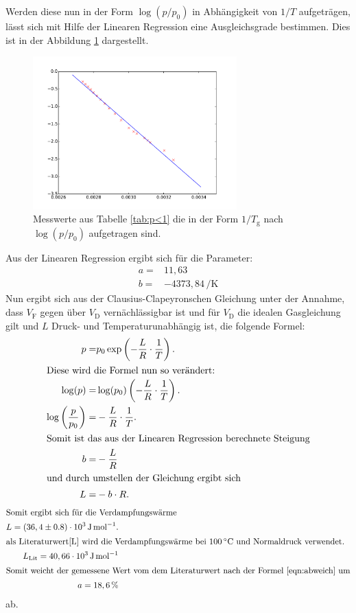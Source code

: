 \FloatBarrier
Werden diese nun in der Form $\log(p/p_\mathrm{0})$ in Abhängigkeit von
$1/T$ aufgeträgen,
lässt sich mit Hilfe der Linearen Regression eine
Ausgleichsgrade bestimmen.
Dies ist in der Abbildung \ref{abb:plot1} dargestellt.
\begin{figure}
  \centering
  \includegraphics[width=0.7\textwidth]{plot1.pdf}
  \caption{Messwerte aus Tabelle \ref{tab:p<1} die in der Form $1/T_\mathrm{g}$ nach $\log(p/p_\mathrm{0})$ aufgetragen sind.}
  \label{abb:plot1}
\end{figure}
\FloatBarrier
Aus der Linearen Regression ergibt sich für die Parameter:
\begin{align*}
  a=&   11,63\\
  b=&  -4373,84\,\si{\per\kelvin}
\end{align*}
Nun ergibt sich aus der Clausius-Clapeyronschen Gleichung
unter der Annahme, dass $V_\mathrm{F}$ gegen über
$V_\mathrm{D}$ vernächlässigbar ist und  für $V_\mathrm{D}$
die idealen Gasgleichung gilt und $L$ Druck- und
Temperaturunabhängig ist, die folgende Formel:
\begin{align}
  p=&p_\mathrm{0}\exp\left(-\frac{L}{R}\cdot\frac{1}{T}\right).\\
\intertext{Diese wird die Formel nun so verändert:}
\log(p)=& \log(p_\mathrm{0})\left(-\frac{L}{R}\cdot\frac{1}{T}\right).\\
\log\left(\frac{p}{p_\mathrm{0}}\right)=&-\frac{L}{R}\cdot\frac{1}{T}.\\
\intertext{Somit ist das aus der Linearen Regression berechnete Steigung}
b=&-\frac{L}{R}\\
\intertext{und durch umstellen der Gleichung ergibt sich}
L=&-b\cdot R.\\
\end{align}
\begin{align*}
\intertext{Somit ergibt sich für die Verdampfungswärme }
L=(36,4\pm0.8)\cdot 10^3 \,\si{\joule\per\mol}.\\
\intertext{als Literaturwert\cite{L} wird die Verdampfungswärme bei $100\,\si{\degreeCelsius}$ und Normaldruck verwendet.}
L_\mathrm{Lit}= 40,66\cdot 10^3 \,\si{\joule\per\mol}\\
\intertext{Somit weicht der gemessene Wert vom dem Literaturwert nach der Formel \eqref{eqn:abweich} um}
a=18,6 \,\si{\percent}
\end{align*}
ab.
